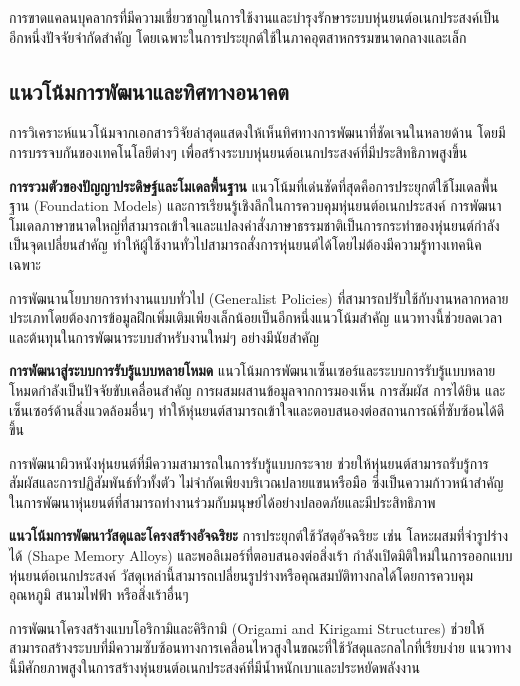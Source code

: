 \documentclass[a4paper]{article}
\begin{document}
การขาดแคลนบุคลากรที่มีความเชี่ยวชาญในการใช้งานและบำรุงรักษาระบบหุ่นยนต์อเนกประสงค์เป็นอีกหนึ่งปัจจัยจำกัดสำคัญ โดยเฉพาะในการประยุกต์ใช้ในภาคอุตสาหกรรมขนาดกลางและเล็ก

\subsection{แนวโน้มการพัฒนาและทิศทางอนาคต}

การวิเคราะห์แนวโน้มจากเอกสารวิจัยล่าสุดแสดงให้เห็นทิศทางการพัฒนาที่ชัดเจนในหลายด้าน โดยมีการบรรจบกันของเทคโนโลยีต่างๆ เพื่อสร้างระบบหุ่นยนต์อเนกประสงค์ที่มีประสิทธิภาพสูงขึ้น

\textbf{การรวมตัวของปัญญาประดิษฐ์และโมเดลพื้นฐาน} แนวโน้มที่เด่นชัดที่สุดคือการประยุกต์ใช้โมเดลพื้นฐาน (Foundation Models) และการเรียนรู้เชิงลึกในการควบคุมหุ่นยนต์อเนกประสงค์ \parencite{yang2024body} การพัฒนาโมเดลภาษาขนาดใหญ่ที่สามารถเข้าใจและแปลงคำสั่งภาษาธรรมชาติเป็นการกระทำของหุ่นยนต์กำลังเป็นจุดเปลี่ยนสำคัญ ทำให้ผู้ใช้งานทั่วไปสามารถสั่งการหุ่นยนต์ได้โดยไม่ต้องมีความรู้ทางเทคนิคเฉพาะ

การพัฒนานโยบายการทำงานแบบทั่วไป (Generalist Policies) ที่สามารถปรับใช้กับงานหลากหลายประเภทโดยต้องการข้อมูลฝึกเพิ่มเติมเพียงเล็กน้อยเป็นอีกหนึ่งแนวโน้มสำคัญ แนวทางนี้ช่วยลดเวลาและต้นทุนในการพัฒนาระบบสำหรับงานใหม่ๆ อย่างมีนัยสำคัญ

\textbf{การพัฒนาสู่ระบบการรับรู้แบบหลายโหมด} แนวโน้มการพัฒนาเซ็นเซอร์และระบบการรับรู้แบบหลายโหมดกำลังเป็นปัจจัยขับเคลื่อนสำคัญ \parencite{tassi2024multimodal} การผสมผสานข้อมูลจากการมองเห็น การสัมผัส การได้ยิน และเซ็นเซอร์ด้านสิ่งแวดล้อมอื่นๆ ทำให้หุ่นยนต์สามารถเข้าใจและตอบสนองต่อสถานการณ์ที่ซับซ้อนได้ดีขึ้น

การพัฒนาผิวหนังหุ่นยนต์ที่มีความสามารถในการรับรู้แบบกระจาย \parencite{yang2024body} ช่วยให้หุ่นยนต์สามารถรับรู้การสัมผัสและการปฏิสัมพันธ์ทั่วทั้งตัว ไม่จำกัดเพียงบริเวณปลายแขนหรือมือ ซึ่งเป็นความก้าวหน้าสำคัญในการพัฒนาหุ่นยนต์ที่สามารถทำงานร่วมกับมนุษย์ได้อย่างปลอดภัยและมีประสิทธิภาพ

\textbf{แนวโน้มการพัฒนาวัสดุและโครงสร้างอัจฉริยะ} การประยุกต์ใช้วัสดุอัจฉริยะ เช่น โลหะผสมที่จำรูปร่างได้ (Shape Memory Alloys) และพอลิเมอร์ที่ตอบสนองต่อสิ่งเร้า กำลังเปิดมิติใหม่ในการออกแบบหุ่นยนต์อเนกประสงค์ \parencite{jin2021origami} วัสดุเหล่านี้สามารถเปลี่ยนรูปร่างหรือคุณสมบัติทางกลได้โดยการควบคุมอุณหภูมิ สนามไฟฟ้า หรือสิ่งเร้าอื่นๆ

การพัฒนาโครงสร้างแบบโอริกามิและคิริกามิ (Origami and Kirigami Structures) ช่วยให้สามารถสร้างระบบที่มีความซับซ้อนทางการเคลื่อนไหวสูงในขณะที่ใช้วัสดุและกลไกที่เรียบง่าย แนวทางนี้มีศักยภาพสูงในการสร้างหุ่นยนต์อเนกประสงค์ที่มีน้ำหนักเบาและประหยัดพลังงาน
\end{document}
